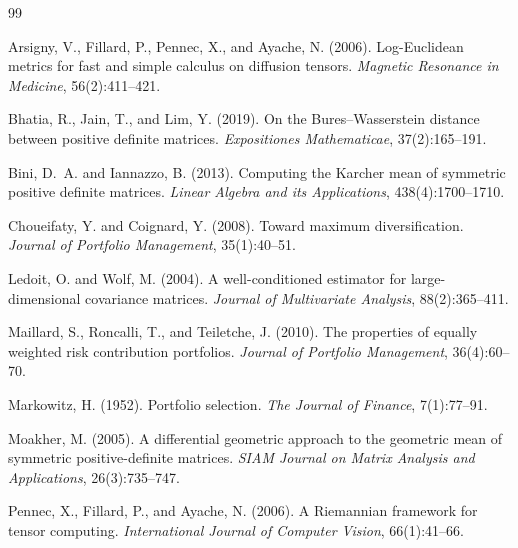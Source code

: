\documentclass[12pt,a4paper]{article}
\begin{document}
\begin{thebibliography}{99}

Arsigny, V., Fillard, P., Pennec, X., and Ayache, N. (2006).
Log-Euclidean metrics for fast and simple calculus on diffusion tensors.
\textit{Magnetic Resonance in Medicine}, 56(2):411--421.

Bhatia, R., Jain, T., and Lim, Y. (2019).
On the Bures--Wasserstein distance between positive definite matrices.
\textit{Expositiones Mathematicae}, 37(2):165--191.

Bini, D.~A. and Iannazzo, B. (2013).
Computing the Karcher mean of symmetric positive definite matrices.
\textit{Linear Algebra and its Applications}, 438(4):1700--1710.

Choueifaty, Y. and Coignard, Y. (2008).
Toward maximum diversification.
\textit{Journal of Portfolio Management}, 35(1):40--51.

Ledoit, O. and Wolf, M. (2004).
A well-conditioned estimator for large-dimensional covariance matrices.
\textit{Journal of Multivariate Analysis}, 88(2):365--411.

Maillard, S., Roncalli, T., and Teiletche, J. (2010).
The properties of equally weighted risk contribution portfolios.
\textit{Journal of Portfolio Management}, 36(4):60--70.

Markowitz, H. (1952).
Portfolio selection.
\textit{The Journal of Finance}, 7(1):77--91.

Moakher, M. (2005).
A differential geometric approach to the geometric mean of symmetric
positive-definite matrices.
\textit{SIAM Journal on Matrix Analysis and Applications}, 26(3):735--747.

Pennec, X., Fillard, P., and Ayache, N. (2006).
A Riemannian framework for tensor computing.
\textit{International Journal of Computer Vision}, 66(1):41--66.

\end{thebibliography}
\end{document}
